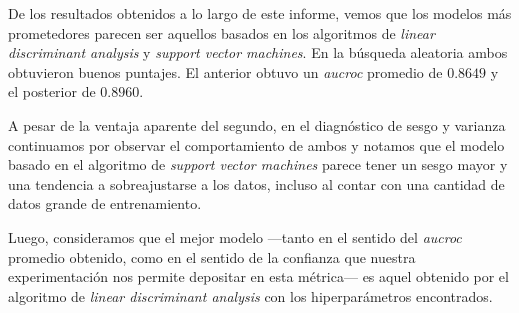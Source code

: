 De los resultados obtenidos a lo largo de este informe, vemos que los modelos más prometedores parecen ser aquellos basados en los algoritmos de \textit{linear discriminant analysis} y \textit{support vector machines}. En la búsqueda aleatoria ambos obtuvieron buenos puntajes. El anterior obtuvo un \textit{aucroc} promedio de $0.8649$ y el posterior de $0.8960$.

A pesar de la ventaja aparente del segundo, en el diagnóstico de sesgo y varianza continuamos por observar el comportamiento de ambos y notamos que el modelo basado en el algoritmo de \textit{support vector machines} parece tener un sesgo mayor y una tendencia a sobreajustarse a los datos, incluso al contar con una cantidad de datos grande de entrenamiento.

Luego, consideramos que el mejor modelo ---tanto en el sentido del \textit{aucroc} promedio obtenido, como en el sentido de la confianza que nuestra experimentación nos permite depositar en esta métrica--- es aquel obtenido por el algoritmo de \textit{linear discriminant analysis} con los hiperparámetros encontrados.  
